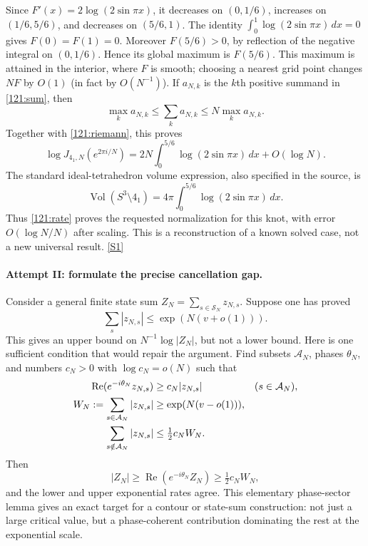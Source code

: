 \documentclass[11pt,a4paper]{article}
\newcommand{\sref}[2]{\hyperlink{source:#1:#2}{[S#2]}}
\numberwithin{equation}{section}
\begin{document}
Since $F'(x)=2\log(2\sin\pi x)$, it decreases on $(0,1/6)$,
increases on $(1/6,5/6)$, and decreases on $(5/6,1)$.
The identity $\int_0^1\log(2\sin\pi x)\,dx=0$ gives
$F(0)=F(1)=0$.  Moreover $F(5/6)>0$, by reflection of the negative
integral on $(0,1/6)$.  Hence its global maximum is $F(5/6)$.
This maximum is attained in the interior, where $F$ is smooth; choosing
a nearest grid point changes $NF$ by $O(1)$ (in fact by $O(N^{-1})$).
If $a_{N,k}$ is the $k$th positive summand in \eqref{121:sum}, then
\[
 \max_k a_{N,k}\leq\sum_k a_{N,k}\leq N\max_k a_{N,k}.
\]
Together with \eqref{121:riemann}, this proves
\begin{equation}\label{121:rate}
 \log J_{4_1,N}(e^{2\pi i/N})
 =2N\int_0^{5/6}\log(2\sin\pi x)\,dx+O(\log N).
\end{equation}
The standard ideal-tetrahedron volume expression, also specified in the
source, is
\[
 \operatorname{Vol}(S^3\setminus4_1)
 =4\pi\int_0^{5/6}\log(2\sin\pi x)\,dx.
\]
Thus \eqref{121:rate} proves the requested normalization for this knot,
with error $O(\log N/N)$ after scaling.  This is a reconstruction of a
known solved case, not a new universal result. \sref{121}{1}

\paragraph{Attempt II: formulate the precise cancellation gap.}
Consider a general finite state sum $Z_N=\sum_{s\in\mathcal S_N}z_{N,s}$.
Suppose one has proved
\[
 \sum_s|z_{N,s}|\leq\exp(N(v+o(1))).
\]
This gives an upper bound on $N^{-1}\log|Z_N|$, but not a lower bound.
Here is one sufficient condition that would repair the argument.  Find
subsets $\mathcal A_N$, phases $\theta_N$, and numbers $c_N>0$ with
$\log c_N=o(N)$ such that
\begin{align}\label{121:phase}
 \operatorname{Re}(e^{-i\theta_N}z_{N,s})&\geq c_N|z_{N,s}|
                 &&(s\in\mathcal A_N),\\
 W_N:=\sum_{s\in\mathcal A_N}|z_{N,s}|&\geq\exp(N(v-o(1))),\notag\\
 \sum_{s\notin\mathcal A_N}|z_{N,s}|&\leq\tfrac12c_NW_N.\notag
\end{align}
Then
\[
 |Z_N|\geq\operatorname{Re}(e^{-i\theta_N}Z_N)
       \geq\tfrac12c_NW_N,
\]
and the lower and upper exponential rates agree.  This elementary
phase-sector lemma gives an exact target for a contour or state-sum
construction: not just a large critical value, but a phase-coherent
contribution dominating the rest at the exponential scale.
\end{document}
